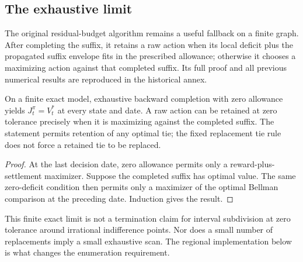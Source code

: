\subsection{The exhaustive limit}
The original residual-budget algorithm remains a useful fallback on a finite graph. After completing the suffix, it retains a raw action when its local deficit plus the propagated suffix envelope fits in the prescribed allowance; otherwise it chooses a maximizing action against that completed suffix. Its full proof and all previous numerical results are reproduced in the historical annex.
\begin{proposition}\label{prop:zero30}
On a finite exact model, exhaustive backward completion with zero allowance yields $J_t^\pi=V_t^*$ at every state and date. A raw action can be retained at zero tolerance precisely when it is maximizing against the completed suffix. The statement permits retention of any optimal tie; the fixed replacement tie rule does not force a retained tie to be replaced.
\end{proposition}
\begin{proof}
At the last decision date, zero allowance permits only a reward-plus-settlement maximizer. Suppose the completed suffix has optimal value. The same zero-deficit condition then permits only a maximizer of the optimal Bellman comparison at the preceding date. Induction gives the result.\end{proof}
This finite exact limit is not a termination claim for interval subdivision at zero tolerance around irrational indifference points. Nor does a small number of replacements imply a small exhaustive scan. The regional implementation below is what changes the enumeration requirement.

